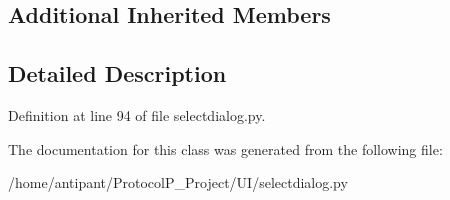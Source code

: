 \subsection*{Additional Inherited Members}


\subsection{Detailed Description}


Definition at line 94 of file selectdialog.\-py.



The documentation for this class was generated from the following file\-:\begin{DoxyCompactItemize}
\item 
/home/antipant/\-Protocol\-P\-\_\-\-Project/\-U\-I/selectdialog.\-py\end{DoxyCompactItemize}
